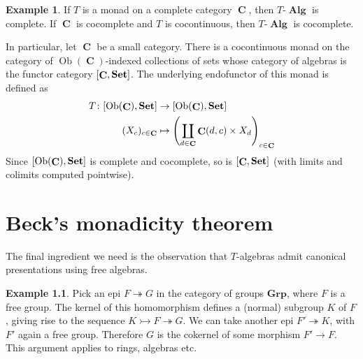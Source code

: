 \documentclass[a4paper,11pt,twoside, openany]{book}
\newcommand{\catname}[1]{{\normalfont\textbf{#1}}}
\DeclareMathOperator{\Alg}{\mathbf{Alg}}
\newcommand{\Set}{\catname{Set}}
\DeclareMathOperator{\C}{\mathbf{C}}
\DeclareMathOperator{\Ob}{Ob}
\theoremstyle{definition}
\theoremstyle{definition}
\newtheorem{exmp}[thm]{Example} %
\theoremstyle{remark}
\begin{document}
\begin{exmp}
	If $T$ is a monad on a complete category $\C$, then $T\mbox{-}\Alg$ is complete. If $\C$ is cocomplete and $T$ is cocontinuous, then $T\mbox{-}\Alg$ is cocomplete.
\end{exmp}
In particular, let $\C$ be a small category. There is a cocontinuous monad on the category of $\Ob(\C)$-indexed collections of sets whose category of algebras is the functor category $[\C,\Set]$. The underlying endofunctor of this monad is defined as 
	\begin{align*}
	T\colon[\Ob(\C),\Set]&\to[\Ob(\C),\Set] \\
	(X_c)_{c\in\C}&\mapsto \left(\coprod_{d\in\C}\C(d,c)\times X_d\right)_{c\in\C}
	\end{align*}
 Since $[\Ob(\C),\Set]$ is complete and cocomplete, so is $[\C,\Set]$ (with limits and colimits computed pointwise).
 
	\chapter{Beck’s monadicity theorem}
	The final ingredient we need is the observation that $T$-algebras admit canonical presentations using free algebras.
	
\begin{exmp}
	Pick an epi $F\twoheadrightarrow G$ in the category of groups $\mathbf{Grp}$, where $F$ is a free group. The kernel of this homomorphism defines a (normal) subgroup $K$ of $F$, giving rise to the sequence $K\rightarrowtail F\twoheadrightarrow G$. We can take another epi $F'\twoheadrightarrow K$, with $F'$ again a free group. Therefore $G$ is the cokernel of some morphism $F'\to F$. This argument applies to rings, algebras etc.
\end{exmp}
\end{document}
